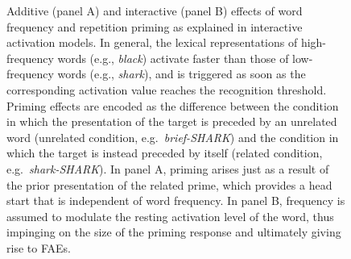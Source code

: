 \documentclass[
]{interact}
\begin{document}
\begin{figure}[H]


\caption{\label{fig-ia-1}Additive (panel A) and interactive (panel B)
effects of word frequency and repetition priming as explained in
interactive activation models. In general, the lexical representations
of high-frequency words (e.g., \emph{black}) activate faster than those
of low-frequency words (e.g., \emph{shark}), and is triggered as soon as
the corresponding activation value reaches the recognition threshold.
Priming effects are encoded as the difference between the condition in
which the presentation of the target is preceded by an unrelated word
(unrelated condition, e.g.~\emph{brief-SHARK}) and the condition in
which the target is instead preceded by itself (related condition,
e.g.~\emph{shark-SHARK}). In panel A, priming arises just as a result of
the prior presentation of the related prime, which provides a head start
that is independent of word frequency. In panel B, frequency is assumed
to modulate the resting activation level of the word, thus impinging on
the size of the priming response and ultimately giving rise to FAEs.}

\end{figure}%
\end{document}
